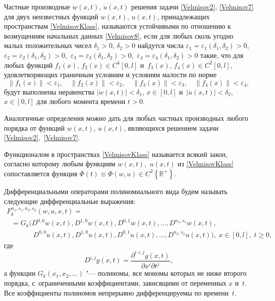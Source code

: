 \smallskip

\hypertarget{Velm:def2}{}

Частные производные $\dot w(x,t)$, $\dot u(x,t)$ решения задачи \eqref{Velmisov2}, \eqref{Velmisov7} для двух неизвестных функций $w(x,t)$, $u(x,t)$, принадлежащих пространствам \eqref{VelmisovKlass}, называются устойчивыми по отношению к возмущениям начальных данных \eqref{Velmisov8}, если для любых сколь угодно малых положительных чисел ${\delta _{1} >0}$, $\delta _{2} >0$ найдутся числа 
$\varepsilon _{1} =\varepsilon _{1} (\delta _{1} ,\delta _{2} )>0$,
$\varepsilon _{2} =\varepsilon _{2} (\delta _{1} ,\delta _{2} )>0,$ 
${\varepsilon _{3} =\varepsilon _{3} (\delta _{1} ,\delta _{2} )>0,}$ 
$\varepsilon _{4} =\varepsilon _{4} (\delta _{1} ,\delta _{2} )>0$ такие, что для любых функций 
$f_{1} (x)$, $ f_{2} (x)\in C^{4} [0,l]$ и~$f_{3} (x)$, $ f_{4} (x)\in C^{2} [0,l]$, удовлетворяющих граничным условиям и условиям малости по норме 
\[
\| f_{1} (x)\| <\varepsilon _{1} ,\quad 
\| f_{2} (x)\| <\varepsilon _{2} ,\quad 
\| f_{3} (x)\| <\varepsilon _{3} ,\quad 
\| f_{4} (x)\| <\varepsilon _{4} ,
\]
будут выполнены неравенства 
$|\dot w(x,t)|<\delta _{1}$, $x\in [0,l]$ и~$|\dot u(x,t)|<\delta _{2}$, $x\in [0,l]$ для любого момента времени $t>0$.

\smallskip

Аналогичные определения можно  дать для  любых частных производных любого порядка от функций $w(x,t)$, $u(x,t)$, являющихся решением задачи \eqref{Velmisov2},~\eqref{Velmisov7}.


\smallskip

\hypertarget{Velm:def3}{}

Функционалом в пространствах \eqref{VelmisovKlass} 
называется всякий закон, согласно которому любым функциям $w(x,t),$  $u(x,t)$ из \eqref{VelmisovKlass} сопоставляется функция $\Phi (t)\equiv \Phi (w,u)\in C^{2} \left\{ \mathbb R^{+} \right\}$.

\smallskip

\hypertarget{Velm:def4}{}

Дифференциальными операторами полиномиального вида будем называть следующие дифференциальные выражения:
\[
\begin{array}{l}
F_k^{n_1,s_1,n_2,s_2} (w,u,x,t) = \\
~~~  = G_k\bigl( D^{0,0} w(x,t), D^{1,0} w(x,t), D^{0,1} w(x,t), \dots, D^{n_1,s_1} w(x,t), 
\\
~~~  \phantom{= G_k\bigl(~} D^{0,0} u(x,t), D^{1,0} u(x,t), D^{0,1} u(x,t), \dots, D^{n_2,s_2} u(x,t)\bigr), \;
x\in [0,l],\; t\ge 0,
\end{array}
\] 
где 
$$D^{i,j} g(x,t)=\frac{\partial ^{i+j} g(x,t)}{\partial x^{i} \partial t^{j} } ,$$ 
а функции $G_k(x_{1} ,x_{2} , \dots)$ "--- полиномы, все мономы которых не ниже второго порядка, с~ограниченными коэффициентами, зависящими от переменных $x$ и~$t$. 
Все коэффициенты полиномов непрерывно дифференцируемы по времени~$t$.

